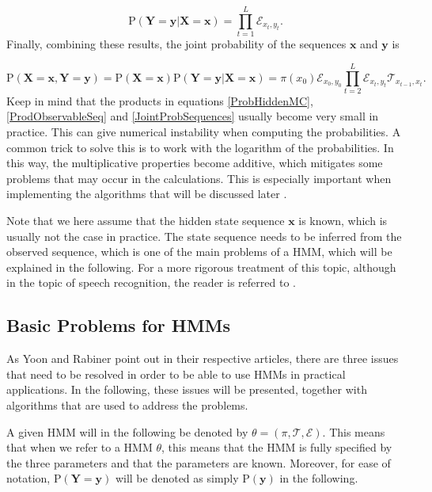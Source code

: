 \documentclass{article}\usepackage[]{graphicx}\usepackage[]{color}
\begin{document}
\begin{equation}
    \text{P}(\mathbf{Y} = \mathbf{y}|\mathbf{X}= \mathbf{x}) = \prod_{t=1}^L\mathcal{E}_{x_t, y_t}.
    \label{ProdObservableSeq}
\end{equation}
Finally, combining these results, the joint probability of the sequences $\mathbf{x}$ and $\mathbf{y}$ is 

\begin{equation}
    \text{P}(\mathbf{X} = \mathbf{x}, \mathbf{Y}= \mathbf{y}) = \text{P}(\mathbf{X}= \mathbf{x})\text{P}(\mathbf{Y}= \mathbf{y}|\mathbf{X}= \mathbf{x}) = \pi(x_0)\mathcal{E}_{x_0, y_0}\prod_{t=2}^L\mathcal{E}_{x_t, y_t}\mathcal{T}_{x_{t-1}, x_t}.
    \label{JointProbSequences}
\end{equation}
Keep in mind that the products in equations \eqref{ProbHiddenMC}, \eqref{ProdObservableSeq} and \eqref{JointProbSequences} usually become very small in practice. This can give numerical instability when computing the probabilities. A common trick to solve this is to work with the logarithm of the probabilities. In this way, the multiplicative properties become additive, which mitigates some problems that may occur in the calculations. This is especially important when implementing the algorithms that will be discussed later \cite{Christianini2006}. 

Note that we here assume that the hidden state sequence $\mathbf{x}$ is known, which is usually not the case in practice. The state sequence needs to be inferred from the observed sequence, which is one of the main problems of a HMM, which will be explained in the following. For a more rigorous treatment of this topic, although in the topic of speech recognition, the reader is referred to \cite{Rabiner1989}.


\subsection{Basic Problems for HMMs}
As Yoon \cite{Yoon2009} and Rabiner \cite{Rabiner1989} point out in their respective articles, there are three issues that need to be resolved in order to be able to use HMMs in practical applications. In the following, these issues will be presented, together with algorithms that are used to address the problems. 

A given HMM will in the following be denoted by $\theta = (\pi, \mathcal{T}, \mathcal{E})$. This means that when we refer to a HMM $\theta$, this means that the HMM is fully specified by the three parameters and that the parameters are known. Moreover, for ease of notation, $\text{P}(\mathbf{Y} = \mathbf{y})$ will be denoted as simply $\text{P}(\mathbf{y})$ in the following. 
\end{document}
